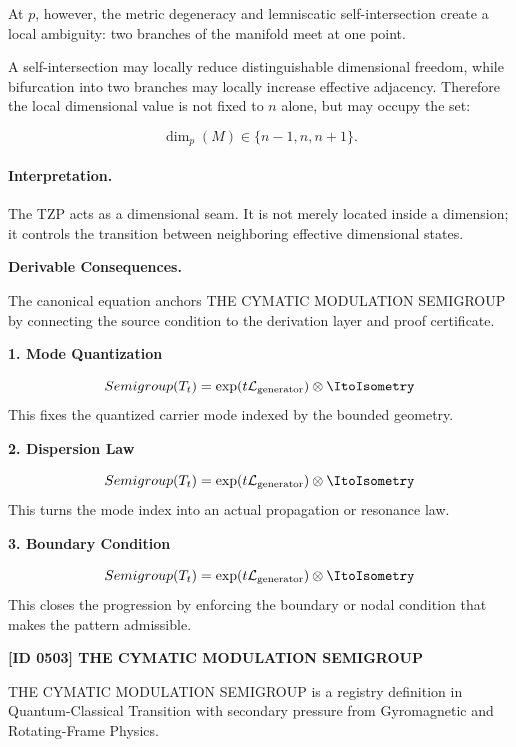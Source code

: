 At $p$, however, the metric degeneracy and lemniscatic self-intersection create a local ambiguity: two branches of the manifold meet at one point.

A self-intersection may locally reduce distinguishable dimensional freedom, while bifurcation into two branches may locally increase effective adjacency. Therefore the local dimensional value is not fixed to $n$ alone, but may occupy the set:

\begin{equation}
\dim_p(M)\in\{n-1,n,n+1\}.
\end{equation}

\paragraph{Interpretation.}
The TZP acts as a dimensional seam. It is not merely located inside a dimension; it controls the transition between neighboring effective dimensional states.

\par\vspace{0.35em}
\noindent\textbf{Derivable Consequences.}\quad
\begingroup
\footnotesize
\raggedright
The canonical equation anchors THE CYMATIC MODULATION SEMIGROUP by connecting the source condition to the derivation layer and proof certificate.
\par\endgroup

\noindent\textbf{1. Mode Quantization}\par
\[
Semigroup(T_t) = \exp(t \mathcal{L}_{\text{generator}}) \otimes \ItoIsometry
\]
\noindent This fixes the quantized carrier mode indexed by the bounded geometry.\par
\noindent\textbf{2. Dispersion Law}\par
\[
Semigroup(T_t) = \exp(t \mathcal{L}_{\text{generator}}) \otimes \ItoIsometry
\]
\noindent This turns the mode index into an actual propagation or resonance law.\par
\noindent\textbf{3. Boundary Condition}\par
\[
Semigroup(T_t) = \exp(t \mathcal{L}_{\text{generator}}) \otimes \ItoIsometry
\]
\noindent This closes the progression by enforcing the boundary or nodal condition that makes the pattern admissible.\par

\clearpage
\noindent\textbf{[ID 0503] THE CYMATIC MODULATION SEMIGROUP}\par
\vspace{0.35em}
\begingroup\small
{}
THE CYMATIC MODULATION SEMIGROUP is a registry definition in Quantum-Classical Transition with secondary pressure from Gyromagnetic and Rotating-Frame Physics.


